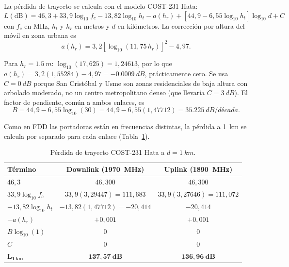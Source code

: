 \documentclass[11pt,letterpaper]{article}
\begin{document}
La pérdida de trayecto se calcula con el modelo COST-231 Hata:
\begin{equation}
L(\mathrm{dB}) = 46{,}3 + 33{,}9\log_{10} f_c - 13{,}82\log_{10} h_t - a(h_r) + \left[44{,}9 - 6{,}55\log_{10} h_t\right]\log_{10} d + C
\label{eq:hata}
\end{equation}
con $f_c$ en MHz, $h_t$ y $h_r$ en metros y $d$ en kilómetros. La corrección por altura del móvil en zona urbana es
\begin{equation}
a(h_r) = 3{,}2\left[\log_{10}(11{,}75\,h_r)\right]^2 - 4{,}97 .
\label{eq:ahr}
\end{equation}

Para $h_r=\SI{1.5}{m}$: $\log_{10}(17{,}625)=1{,}24613$, por lo que $a(h_r)=3{,}2(1{,}55284)-4{,}97=\SI{-0.0009}{dB}$, prácticamente cero. Se usa $C=\SI{0}{dB}$ porque San Cristóbal y Usme son zonas residenciales de baja altura con arbolado moderado, no un centro metropolitano denso (que llevaría $C=\SI{3}{dB}$). El factor de pendiente, común a ambos enlaces, es
\begin{equation}
B = 44{,}9 - 6{,}55\log_{10}(30) = 44{,}9 - 6{,}55(1{,}47712) = \SI{35.225}{dB/década}.
\end{equation}

Como en FDD las portadoras están en frecuencias distintas, la pérdida a \SI{1}{km} se calcula por separado para cada enlace (Tabla~\ref{tab:hata}).

\begin{table}[H]
\centering
\caption{Pérdida de trayecto COST-231 Hata a $d=\SI{1}{km}$.}
\label{tab:hata}
\begin{tabular}{@{}lcc@{}}
\toprule
\textbf{Término} & \textbf{Downlink (\SI{1970}{MHz})} & \textbf{Uplink (\SI{1890}{MHz})} \\
\midrule
$46{,}3$ & $46{,}300$ & $46{,}300$ \\
$33{,}9\log_{10} f_c$ & $33{,}9(3{,}29447)=111{,}683$ & $33{,}9(3{,}27646)=111{,}072$ \\
$-13{,}82\log_{10} h_t$ & $-13{,}82(1{,}47712)=-20{,}414$ & $-20{,}414$ \\
$-a(h_r)$ & $+0{,}001$ & $+0{,}001$ \\
$B\log_{10}(1)$ & $0$ & $0$ \\
$C$ & $0$ & $0$ \\
\midrule
$\mathbf{L_{1\,km}}$ & $\mathbf{137{,}57\ dB}$ & $\mathbf{136{,}96\ dB}$ \\
\bottomrule
\end{tabular}
\end{table}
\end{document}
